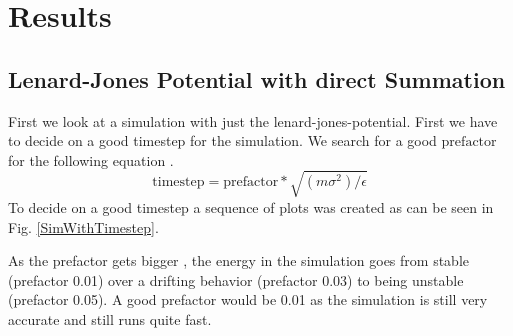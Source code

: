 \chapter{Results}

\section{Lenard-Jones Potential with direct Summation}

First we look at a simulation with just the lenard-jones-potential. First we have to decide on a good timestep for the simulation. We search for a good $ \mathrm{prefactor} $ for the following equation \cite{molDymCourse}.
\begin{equation}
	\label{timestepDeterminant}
 \mathrm{timestep} = \mathrm{prefactor} * \sqrt{(m\sigma^2)/\epsilon} 
\end{equation}
To decide on a good timestep a sequence of plots was created as can be seen in Fig. \ref{SimWithTimestep}. 
\par 
As the prefactor gets bigger , the energy in the simulation goes from stable (prefactor 0.01) over a drifting behavior (prefactor 0.03) to being unstable (prefactor 0.05). A good prefactor would be 0.01 as the simulation is still very accurate and still runs quite fast. 

